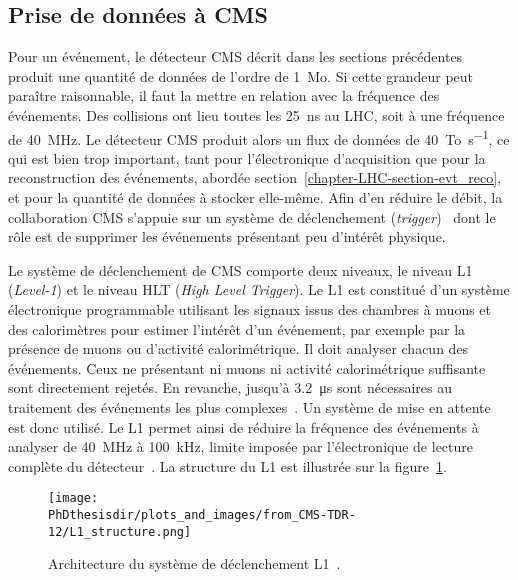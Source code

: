 \subsection{Prise de données à CMS}\label{chapter-LHC-section-CMS-subsec-data_taking}
Pour un événement, le détecteur CMS décrit dans les sections précédentes produit une quantité de données de l'ordre de \SI{1}{\mega o}.
Si cette grandeur peut paraître raisonnable, il faut la mettre en relation avec la fréquence des événements.
Des collisions ont lieu toutes les \SI{25}{\nano\second} au LHC, soit à une fréquence de \SI{40}{\mega\hertz}.
Le détecteur CMS produit alors un flux de données de \SI{40}{\tera o.\second^{-1}}, ce qui est bien trop important, tant pour l'électronique d'acquisition que pour la reconstruction des événements, abordée section~\ref{chapter-LHC-section-evt_reco}, et pour la quantité de données à stocker elle-même.
Afin d'en réduire le débit, la collaboration CMS s'appuie sur un système de déclenchement (\emph{trigger})~\cite{cms_paper,CERN-LHCC-2000-038,CERN-LHCC-2002-026,CMS-TRG-12-001,CMS-TDR-12} dont le rôle est de supprimer les événements présentant peu d'intérêt physique.
\par Le système de déclenchement de CMS comporte deux niveaux, le niveau \og L1 \fg{} (\emph{Level-1}) et le niveau \og HLT \fg{} (\emph{High Level Trigger}).
Le L1 est constitué d'un système électronique programmable utilisant les signaux issus des chambres à muons et des calorimètres pour estimer l'intérêt d'un événement, par exemple par la présence de muons ou d'activité calorimétrique.
Il doit analyser chacun des événements.
Ceux ne présentant ni muons ni activité calorimétrique suffisante sont directement rejetés.
En revanche, jusqu'à \SI{3.2}{\micro\second} sont nécessaires au traitement des événements les plus complexes~\cite{cms_paper}.
Un système de mise en attente est donc utilisé.
Le L1 permet ainsi de réduire la fréquence des événements à analyser de \SI{40}{\mega\hertz} à \SI{100}{\kilo\hertz}, limite imposée par l'électronique de lecture complète du détecteur~\cite{CMS-TRG-12-001}.
La structure du L1 est illustrée sur la figure~\ref{fig-chapter-LHC-section-CMS-subsec-data_taking-cms_paper-fig_8-1}.
\begin{figure}[h]
\centering
\texttt{[image: \\PhDthesisdir/plots\_and\_images/from\_CMS-TDR-12/L1\_structure.png]}
\caption[Architecture du système de déclenchement L1.]{Architecture du système de déclenchement L1~\cite{CMS-TDR-12}.}
\label{fig-chapter-LHC-section-CMS-subsec-data_taking-cms_paper-fig_8-1}
\end{figure}
